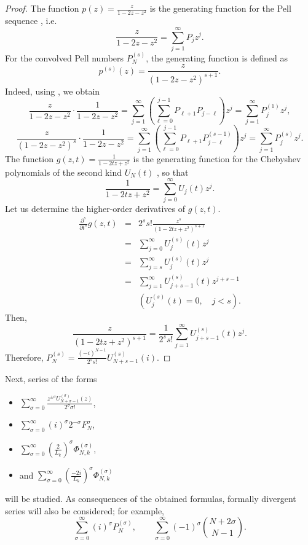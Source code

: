 \documentclass{article}
\begin{document}
\begin{proof}
The function $p(z) = \frac{z}{1 - 2z - z^2}$ is the generating function for the Pell sequence \cite{ref8}, i.e.
$$
\frac{z}{1 - 2z - z^2} = \sum_{j = 1}^{\infty}P_j z^j.
$$
For the convolved Pell numbers $P_N^{(s)}$, the generating function is defined as
$$
p^{(s)}(z) = \frac{z}{(1 - 2z - z^2)^{s + 1}}.
$$
Indeed, using \cite[p. 216]{ref6}, we obtain
$$
\frac{z}{1 - 2z - z^2} \cdot \frac{1}{1 - 2z - z^2} = \sum_{j = 1}^{\infty}\left(\sum_{\ell = 0}^{j - 1}P_{\ell + 1}P_{j - \ell}\right)z^j = \sum_{j = 1}^{\infty}P_j^{(1)}z^j,
$$
$$
\frac{z}{(1 - 2z - z^2)^s} \cdot \frac{1}{1 - 2z - z^2} = \sum_{j = 1}^{\infty}\left(\sum_{\ell = 0}^{j - 1}P_{\ell + 1}P_{j - \ell}^{(s - 1)}\right)z^j = \sum_{j = 1}^{\infty}P_j^{(s)}z^j.
$$
The function $g(z,t) = \frac{1}{1 - 2tz + z^2}$ is the generating function for the Chebyshev polynomials of the second kind $U_N(t)$ \cite{ref5}, so that
$$
\frac{1}{1 - 2tz + z^2} = \sum_{j = 0}^{\infty}U_j(t)z^j.
$$
Let us determine the higher-order derivatives of $g(z,t)$.
\begin{eqnarray*}
\frac{\partial^s}{\partial t^s}g(z,t) &=& 2^s s!\frac{z^s}{(1 - 2tz + z^2)^{s + 1}} \\
&=& \sum_{j = 0}^{\infty}U_j^{(s)}(t)z^j \\
&=& \sum_{j = s}^{\infty}U_j^{(s)}(t)z^j \\
&=& \sum_{j = 1}^{\infty}U_{j + s - 1}^{(s)}(t)z^{j + s - 1} \\
& & (U_j^{(s)}(t) = 0, \quad j < s).
\end{eqnarray*}
Then,
$$
 \frac{z}{(1 - 2tz + z^2)^{s + 1}} = \frac{1}{2^s s!}\sum_{j = 1}^{\infty}U_{j + s - 1}^{(s)}(t) z^j.
$$
Therefore, $P_N^{(s)} = \frac{(-i)^{N - 1}}{2^s s!}U_{N + s - 1}^{(s)}(i)$.
\end{proof}

Next, series of the forms
\begin{itemize}
\item $\displaystyle \sum_{\sigma = 0}^{\infty} \frac{z^{\pm \sigma}U_{N + \sigma - 1}^{(\sigma)}(z)}{2^\sigma \sigma!}$,
\item $\displaystyle \sum_{\sigma = 0}^{\infty} (i)^{\sigma}2^{-\sigma}F_N^{\sigma}$,
\item $\displaystyle \sum_{\sigma = 0}^{\infty}\left(\frac{2}{L_k}\right)^\sigma \Phi_{N,k}^{(\sigma)}$,
\item and $\displaystyle \sum_{\sigma = 0}^{\infty}\left(\frac{-2i}{L_k}\right)^\sigma \Phi_{N,k}^{(\sigma)}$
\end{itemize}
will be studied. As consequences of the obtained formulas, formally divergent series will also be considered; for example,
$$
\sum_{\sigma = 0}^{\infty}(i)^\sigma P_N^{(\sigma)}, \qquad \sum_{\sigma = 0}^{\infty}(-1)^\sigma{N + 2\sigma \choose N - 1}.
$$
\end{document}

